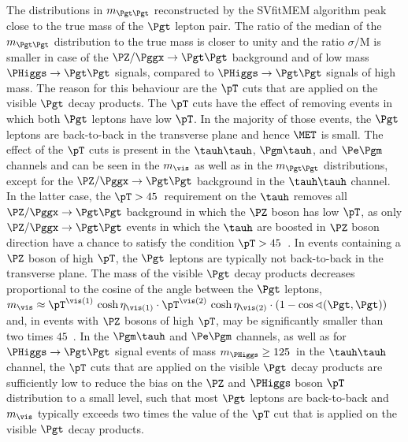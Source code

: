 The distributions in $m_{\Pgt\Pgt}$ reconstructed by the SVfitMEM algorithm 
peak close to the true mass of the $\Pgt$ lepton pair.
The ratio of the median of the $m_{\Pgt\Pgt}$ distribution to the true
mass is closer to unity and the ratio $\sigma/\textrm{M}$ is smaller
in case of the $\PZ/\Pggx \to \Pgt\Pgt$ background and of low mass $\PHiggs \to \Pgt\Pgt$ signals, compared to $\PHiggs \to \Pgt\Pgt$ signals of high mass.
The reason for this behaviour are the $\pT$ cuts that are applied on the visible $\Pgt$ decay products.
The $\pT$ cuts have the effect of removing events in which both $\Pgt$
leptons have low $\pT$.
In the majority of those events,
the $\Pgt$ leptons are back-to-back in the transverse plane
and hence $\MET$ is small.
The effect of the $\pT$ cuts is present in the $\tauh\tauh$, $\Pgm\tauh$, and $\Pe\Pgm$ channels and can be seen in the $m_{\vis}$ as well as in the $m_{\Pgt\Pgt}$ distributions,
except for the $\PZ/\Pggx \to \Pgt\Pgt$ background in the $\tauh\tauh$ channel.
In the latter case,
the $\pT > 45$~\GeV requirement on the $\tauh$ 
removes all $\PZ/\Pggx \to \Pgt\Pgt$ background in which the $\PZ$ boson has low $\pT$,
as only $\PZ/\Pggx \to \Pgt\Pgt$ events in which the $\tauh$ are boosted in $\PZ$ boson direction have a chance to satisfy the condition $\pT > 45$~\GeV.
In events containing a $\PZ$ boson of high $\pT$,
the $\Pgt$ leptons are typically not back-to-back in the transverse plane.
The mass of the visible $\Pgt$ decay products decreases proportional to the cosine of the angle between the $\Pgt$ leptons,
$m_{\vis} \approx \pT^{\vis(1)} \, \cosh\eta_{\vis(1)} \cdot
\pT^{\vis(2)} \, \cosh\eta_{\vis(2)} \cdot \left( 1 - \cos\sphericalangle(\Pgt,\Pgt) \right)$
and, in events with $\PZ$ bosons of high $\pT$, may be significantly smaller than two times $45$~\GeV.
In the $\Pgm\tauh$ and $\Pe\Pgm$ channels, as well as for $\PHiggs \to \Pgt\Pgt$ signal events of mass $m_{\PHiggs} \geq 125$~\GeV in the $\tauh\tauh$ channel,
the $\pT$ cuts that are applied on the visible $\Pgt$ decay products 
are sufficiently low to reduce the bias on the $\PZ$ and $\PHiggs$ boson $\pT$ distribution to a small level,
such that most $\Pgt$ leptons are back-to-back and $m_{\vis}$
typically exceeds two times the value of the $\pT$ cut that is applied on the visible $\Pgt$ decay products.

